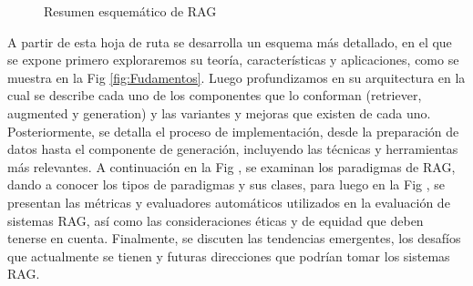\begin{figure}[H]
\begin{center}
\end{center}
\caption{Resumen esquemático de RAG}
\label{fig:secciones-rag}
\end{figure}

A partir de esta hoja de ruta se desarrolla un esquema más detallado, en el que se expone primero exploraremos su teoría, 
características y aplicaciones, como se muestra en la Fig \ref{fig:Fudamentos}. Luego profundizamos en su arquitectura en la cual 
se describe cada uno de los componentes que lo conforman (retriever, augmented y generation) y las variantes y mejoras que existen de cada uno. 
Posteriormente, se detalla el proceso de implementación, desde la preparación de datos hasta el componente de generación, incluyendo las técnicas y herramientas más relevantes.
A continuación en la Fig , se examinan los paradigmas de RAG, dando a conocer los tipos de paradigmas y sus clases, para luego en la Fig , se presentan las métricas y evaluadores automáticos 
utilizados en la evaluación de sistemas RAG, así como las consideraciones éticas y de equidad que deben tenerse en cuenta.
Finalmente, se discuten las tendencias emergentes, los desafíos que actualmente se tienen y futuras direcciones que podrían tomar los sistemas RAG.



